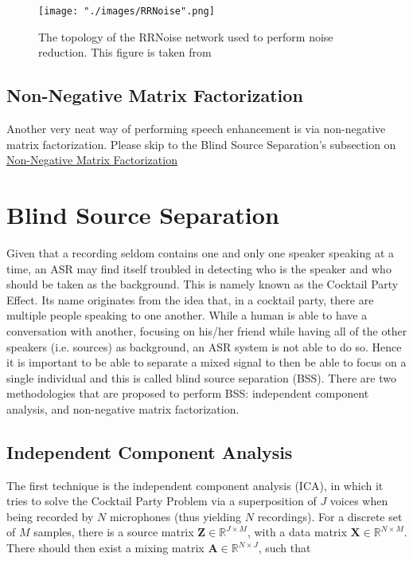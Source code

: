 \begin{figure}[H]
\begin{center}
    \texttt{[image: "./images/RRNoise".png]}
    \caption{The topology of the RRNoise network used to perform noise reduction. This figure is taken from \cite{rrnoise}}
    \label{fig::RRNoisearch}
\end{center}
\end{figure}

\subsection{Non-Negative Matrix Factorization}
Another very neat way of performing speech enhancement is via non-negative matrix factorization. Please skip to the Blind Source Separation's subsection on \hyperref[sec:NMF]{Non-Negative Matrix Factorization} \cite{spectralclustering}

\section{Blind Source Separation}
Given that a recording seldom contains one and only one speaker speaking at a time, an ASR may find itself troubled in detecting who is the speaker and who should be taken as the background. This is namely known as the Cocktail Party Effect. Its name originates from the idea that, in a cocktail party, there are multiple people speaking to one another. While a human is able to have a conversation with another, focusing on his/her friend while having all of the other speakers (i.e. sources) as background, an ASR system is not able to do so. Hence it is important to be able to separate a mixed signal to then be able to focus on a single individual and this is called blind source separation (BSS). There are two methodologies that are proposed to perform BSS: independent component analysis, and non-negative matrix factorization.


\subsection{Independent Component Analysis}
The first technique is the independent component analysis (ICA), in which it tries to solve the Cocktail Party Problem via a superposition of $J$ voices when being recorded by $N$ microphones (thus yielding $N$ recordings). For a discrete set of $M$ samples, there is a source matrix $\bm{Z} \in \mathbb{R}^{J \times M}$, with a data matrix $\bm{X} \in \mathbb{R}^{N\times M}$. There should then exist a mixing matrix $\bm{A} \in \mathbb{R}^{N\times J}$, such that

